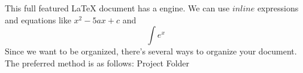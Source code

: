 \markdownRendererUlBegin
\markdownRendererUlItem This full featured LaTeX document has a  engine.\markdownRendererUlItemEnd 
\markdownRendererUlItem We can use $inline$ expressions and equations like $x^2-5ax+c$ and $$\int e^x$$\markdownRendererUlItemEnd 
\markdownRendererUlEnd \markdownRendererInterblockSeparator
{}\markdownRendererInterblockSeparator
{}Since we want to be organized, there's several ways to organize your document. The preferred method is as follows:\markdownRendererInterblockSeparator
{}\markdownRendererUlBeginTight
\markdownRendererUlItem Project Folder\markdownRendererUlItemEnd 
\markdownRendererUlEndTight \relax